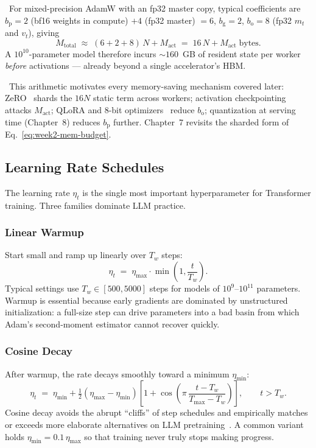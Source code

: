 \Emp\ For mixed-precision AdamW with an fp32 master copy, typical
coefficients are $b_{\mathrm p} = 2$ (bf16 weights in compute) $+ 4$
(fp32 master) $= 6$, $b_{\mathrm g} = 2$, $b_{\mathrm o} = 8$ (fp32
$m_t$ and $v_t$), giving
\[
M_{\mathrm{total}} \;\approx\; (6 + 2 + 8)\,N + M_{\mathrm{act}}
  \;=\; 16\,N + M_{\mathrm{act}}\;\text{bytes}.
\]
A $10^{10}$-parameter model therefore incurs $\sim 160$~GB of
resident state per worker \emph{before} activations — already beyond
a single accelerator's HBM.

\Cons\ This arithmetic motivates every memory-saving mechanism
covered later: ZeRO~\citep{rajbhandari2020zero} shards the $16N$
static term across workers; activation checkpointing attacks
$M_{\mathrm{act}}$; QLoRA and 8-bit optimizers~\citep{dettmers20228bit}
reduce $b_{\mathrm o}$; quantization at serving time (Chapter~8) reduces
$b_{\mathrm p}$ further. Chapter~7 revisits the sharded form of
Eq.~\eqref{eq:week2-mem-budget}.

\subsection{Learning Rate Schedules}

The learning rate $\eta_t$ is the single most important hyperparameter
for Transformer training. Three families dominate LLM practice.

\subsubsection{Linear Warmup}

Start small and ramp up linearly over $T_w$ steps:
\begin{equation}
\eta_t \;=\; \eta_{\max} \cdot \min\!\left(1, \frac{t}{T_w}\right).
\end{equation}
Typical settings use $T_w \in [500, 5000]$ steps for models of
$10^{9}$--$10^{11}$ parameters. Warmup is essential because early
gradients are dominated by unstructured initialization: a full-size step
can drive parameters into a bad basin from which Adam's second-moment
estimator cannot recover quickly.

\subsubsection{Cosine Decay}

After warmup, the rate decays smoothly toward a minimum $\eta_{\min}$:
\begin{equation}
\eta_t \;=\; \eta_{\min} + \tfrac{1}{2}(\eta_{\max} - \eta_{\min})
            \left[1 + \cos\!\left(\pi\,\frac{t - T_w}{T_{\max} - T_w}\right)\right],
\qquad t > T_w.
\end{equation}
Cosine decay avoids the abrupt ``cliffs'' of step schedules and empirically
matches or exceeds more elaborate alternatives on LLM
pretraining~\citep{loshchilov2017sgdr}. A common variant holds
$\eta_{\min} = 0.1\,\eta_{\max}$ so that training never truly stops making
progress.

